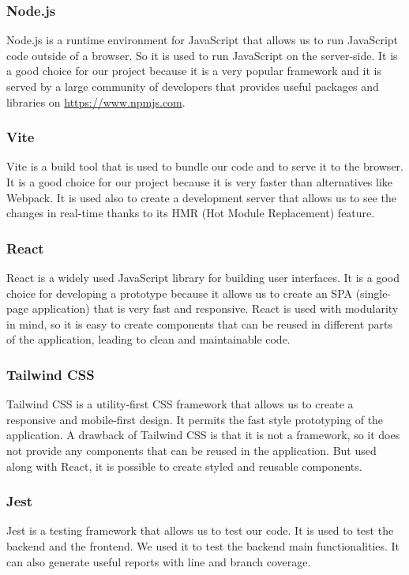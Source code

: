 \subsubsection{Node.js}
Node.js is a runtime environment for JavaScript that allows us to run JavaScript code outside of a browser. So it is used
to run JavaScript on the server-side. It is a good choice for our project because it is a very popular framework and it is
served by a large community of developers that provides useful packages and libraries on \url{https://www.npmjs.com}.
\subsubsection{Vite}
Vite is a build tool that is used to bundle our code and to serve it to the browser. It is a good choice for our project because it is very faster than alternatives like Webpack.
It is used also to create a development server that allows us to see the changes in real-time thanks to its HMR (Hot Module Replacement) feature.
\subsubsection{React}
React is a widely used JavaScript library for building user interfaces.
It is a good choice for developing a prototype because it allows us to create an SPA (single-page application) that is very fast and responsive.
React is used with modularity in mind, so it is easy to create components that can be reused in different parts of the application, leading to clean and maintainable code.
\subsubsection{Tailwind CSS}
Tailwind CSS is a utility-first CSS framework that allows us to create a responsive and mobile-first design. It permits the fast style prototyping of the application.
A drawback of Tailwind CSS is that it is not a framework, so it does not provide any components that can be reused in the application. But used along with React, it is possible to create styled and reusable components.
\subsubsection{Jest}
Jest is a testing framework that allows us to test our code. It is used to test the backend and the frontend.
We used it to test the backend main functionalities. It can also generate useful reports with line and branch coverage.
